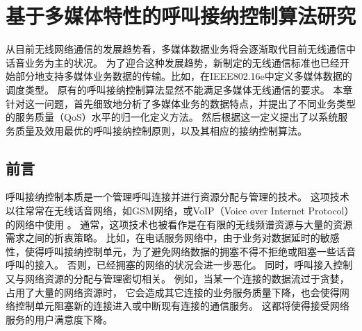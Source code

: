 \graphicspath{ {../body/cacop_figures/}}
\chapter{基于多媒体特性的呼叫接纳控制算法研究}
\label{chap_cacop}

从目前无线网络通信的发展趋势看，多媒体数据业务将会逐渐取代目前无线通信中话音业务为主的状况。
为了迎合这种发展趋势，新制定的无线通信标准也已经开始部分地支持多媒体业务数据的传输。比如，在IEEE802.16e中定义多媒体数据的调度类型。
原有的呼叫接纳控制算法显然不能满足多媒体无线通信的要求。
本章针对这一问题，首先细致地分析了多媒体业务的数据特点，并提出了不同业务类型的服务质量（QoS）水平的归一化定义方法。
然后根据这一定义提出了以系统服务质量及效用最优的呼叫接纳控制原则，以及其相应的接纳控制算法。

\section{前言}
呼叫接纳控制本质是一个管理呼叫连接并进行资源分配与管理的技术。
这项技术以往常常在无线话音网络，如GSM网络，或VoIP（Voice over Internet Protocol）的网络中使用\cite{Perros1996}\cite{Mase2004}
\cite{Systems_2001}\cite{Y-G-Fang.TVT.2002}\cite{Y-Xiao.IEICE.TC.2001}。
通常，这项技术也被看作是在有限的无线频谱资源与大量的资源需求之间的折衷策略。
比如，在电话服务网络中，由于业务对数据延时的敏感性，使得呼叫接纳控制单元，为了避免网络数据的拥塞不得不拒绝或阻塞一些话音呼叫的接入。
否则，已经拥塞的网络的状况会进一步恶化。
同时，呼叫接入控制又与网络资源的分配与管理密切相关。
例如，当某一个连接的数据流过于贪婪，占用了大量的网络资源时，
它会造成其它连接的业务服务质量下降，也会使得网络控制单元阻塞新的连接进入或中断现有连接的通信服务。
这都将使得接受网络服务的用户满意度下降。

